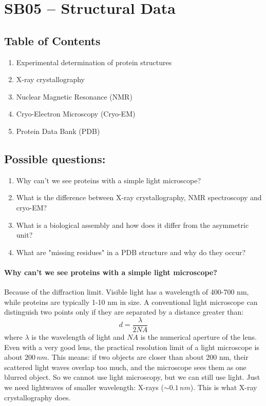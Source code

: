 \section{SB05 -- Structural Data \done}

\subsection*{Table of Contents}

\begin{enumerate}
\item Experimental determination of protein structures
\item X-ray crystallography
\item Nuclear Magnetic Resonance (NMR)
\item Cryo-Electron Microscopy (Cryo-EM)
\item Protein Data Bank (PDB)
\end{enumerate}


\subsection*{Possible questions:}
\begin{enumerate}
\item{Why can't we see proteins with a simple light microscope? \done}
\item{What is the difference between X-ray crystallography, NMR spectroscopy and cryo-EM? \done}

\vspace*{0.5cm}
\item{What is a biological assembly and how does it differ from the asymmetric unit?}
\item{What are "missing residues" in a PDB structure and why do they occur?}
\end{enumerate}

\paragraph{Why can't we see proteins with a simple light microscope? \done}
Because of the diffraction limit. Visible light has a wavelength of 400-700 nm, while proteins are typically 1-10 nm in size. A conventional light microscope can distinguish two points only if they are separated by a distance greater than:
$$
d = \frac{\lambda}{2NA}
$$
where $\lambda$ is the wavelength of light and $NA$ is the numerical aperture of the lens. Even with a very good lens, the practical resolution limit of a light microscope is about $200\,nm$. This means: if two objects are closer than about 200 nm, their scattered light waves overlap too much, and the microscope sees them as one blurred object.
So we cannot use light microscopy, but we can still use light. Just we need lightwaves of smaller wavelength: X-rays ($\sim 0.1\,nm$). This is what X-ray crystallography does.


